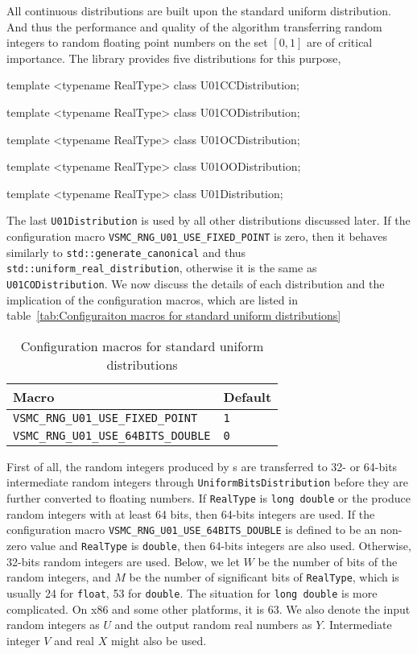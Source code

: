 All continuous distributions are built upon the standard uniform distribution.
And thus the performance and quality of the algorithm transferring random
integers to random floating point numbers on the set $[0, 1]$ are of critical
importance. The library provides five distributions for this purpose,
\begin{cppcode}
  template <typename RealType>
  class U01CCDistribution;

  template <typename RealType>
  class U01CODistribution;

  template <typename RealType>
  class U01OCDistribution;

  template <typename RealType>
  class U01OODistribution;

  template <typename RealType>
  class U01Distribution;
\end{cppcode}
The last \verb|U01Distribution| is used by all other distributions discussed
later. If the configuration macro \verb|VSMC_RNG_U01_USE_FIXED_POINT| is zero,
then it behaves similarly to \verb|std::generate_canonical| and thus
\verb|std::uniform_real_distribution|, otherwise it is the same as
\verb|U01CODistribution|. We now discuss the details of each distribution and
the implication of the configuration macros, which are listed in
table~\ref{tab:Configuraiton macros for standard uniform distributions}

\begin{table}
  \begin{tabularx}{\textwidth}{XX}
    \toprule
    Macro & Default \\
    \midrule
    \verb|VSMC_RNG_U01_USE_FIXED_POINT|   & \verb|1| \\
    \verb|VSMC_RNG_U01_USE_64BITS_DOUBLE| & \verb|0| \\
    \bottomrule
  \end{tabularx}
  \caption{Configuration macros for standard uniform distributions}
  \label{tab:Configuration macros for standard uniform distributions}
\end{table}

First of all, the random integers produced by \rng{}s are transferred to 32- or
64-bits intermediate random integers through \verb|UniformBitsDistribution|
before they are further converted to floating numbers. If \verb|RealType| is
\verb|long double| or the \rng{} produce random integers with at least 64 bits,
then 64-bits integers are used. If the configuration macro
\verb|VSMC_RNG_U01_USE_64BITS_DOUBLE| is defined to be an non-zero value and
\verb|RealType| is \verb|double|, then 64-bits integers are also used.
Otherwise, 32-bits random integers are used. Below, we let $W$ be the number of
bits of the random integers, and $M$ be the number of significant bits of
\verb|RealType|, which is usually 24 for \verb|float|, 53 for \verb|double|.
The situation for \verb|long double| is more complicated. On x86 and some other
platforms, it is 63. We also denote the input random integers as $U$ and the
output random real numbers as $Y$. Intermediate integer $V$ and real $X$ might
also be used.

